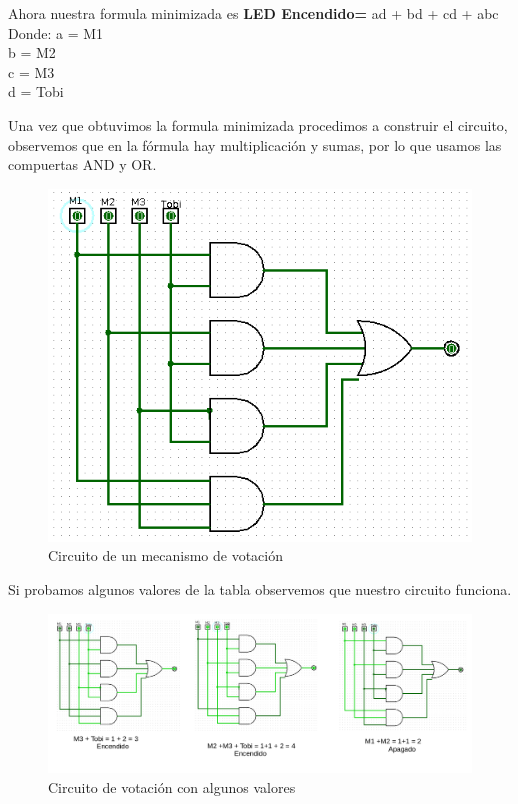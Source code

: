 \documentclass[11pt,letterpaper]{article}
\begin{document}
\begin{itemize}
	Ahora nuestra formula minimizada es \textbf{LED Encendido=} ad + bd + cd + abc\\
	Donde: a = M1\\
	\hspace*{1.3cm} b = M2\\
	\hspace*{1.3cm} c = M3\\
	\hspace*{1.3cm} d = Tobi
	
	Una vez que obtuvimos la formula minimizada procedimos a construir el circuito, observemos que en la fórmula hay multiplicación y sumas, por lo que usamos las compuertas AND y OR.
	
	\begin{figure}[h]
		\centering
		\includegraphics[scale=0.5]{CircVot.png}
		\caption{Circuito de un mecanismo de votación}
	\end{figure}

	Si probamos algunos valores de la tabla observemos que nuestro circuito funciona.
	
	\begin{figure}[h]
		\centering
		\includegraphics[scale=0.45]{Votaciones.png}
		\caption{Circuito de votación con algunos valores}
	\end{figure}
	
\end{itemize}
\end{document}
